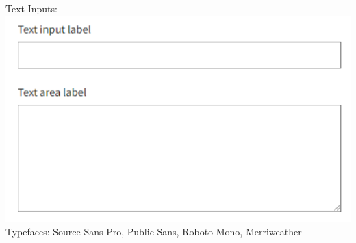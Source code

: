 \documentclass{article}
\begin{document}
Text Inputs: \\
\includegraphics{text_inputs} \\
Typefaces: Source Sans Pro, Public Sans, Roboto Mono, Merriweather
\end{document}
